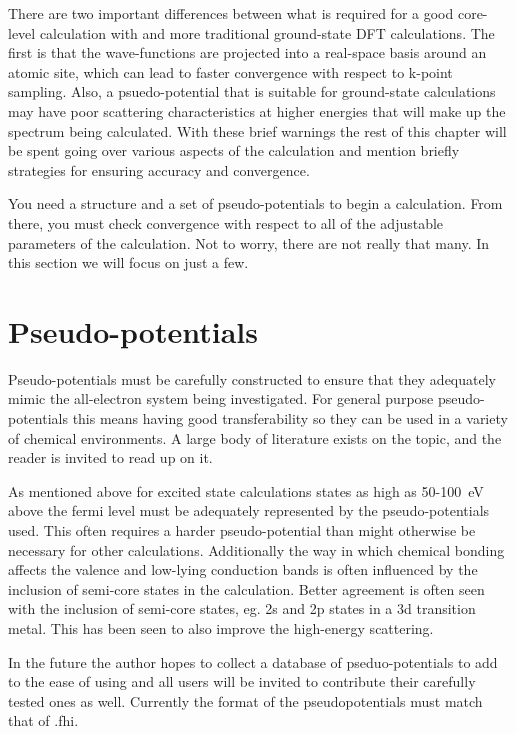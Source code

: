 \documentclass[11pt]{report}
\begin{document}
There are two important differences between what is required for a good core-level calculation with \OCEAN{} and more traditional ground-state DFT calculations. The first is that the wave-functions are projected into a real-space basis around an atomic site, which can lead to faster convergence with respect to k-point sampling. Also, a psuedo-potential that is suitable for ground-state calculations may have poor scattering characteristics at higher energies that will make up the spectrum being calculated. With these brief warnings the rest of this chapter will be spent going over various aspects of the calculation and mention briefly strategies for ensuring accuracy and convergence.

You need a structure and a set of pseudo-potentials to begin a calculation. From there, you must check convergence with respect to all of the adjustable parameters of the calculation. Not to worry, there are not really that many. In this section we will focus on just a few.

\section{Pseudo-potentials}

Pseudo-potentials must be carefully constructed to ensure that they adequately mimic the all-electron system being investigated. For general purpose pseudo-potentials this means having good transferability so they can be used in a variety of chemical environments. A large body of literature exists on the topic, and the reader is invited to read up on it.\cite{Psp} 

As mentioned above for excited state calculations states as high as 50-100~eV above the fermi level must be adequately represented by the pseudo-potentials used. This often requires a harder pseudo-potential than might otherwise be necessary for 
other calculations. Additionally the way in which chemical bonding affects the valence and low-lying conduction bands is often influenced by the inclusion of semi-core states in the calculation. Better agreement is often seen with the inclusion of semi-core states, eg. 2s and 2p states in a 3d transition metal. This has been seen to also improve the high-energy scattering.\cite{}

In the future the author hopes to collect a database of pseduo-potentials to add to the ease of using \OCEAN{}
 and all users will be invited to contribute their carefully tested ones as well. Currently the format of the pseudopotentials must
 match that of  .fhi.
\end{document}
